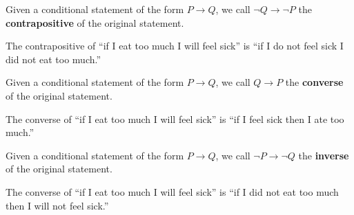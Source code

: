 \documentclass[]{article}
\begin{document}
\begin{defn}[Contrapositive] Given a conditional statement of the form $P \rightarrow Q$, we call $\neg Q \rightarrow \neg P$ the \textbf{contrapositive} of the original statement. 
\end{defn}
\begin{exmp} The contrapositive of ``if I eat too much I will feel sick'' is ``if I do not feel sick I did not eat too much.''
\end{exmp}
\begin{defn}[Converse] Given a conditional statement of the form $P \rightarrow Q$, we call $Q \rightarrow P$ the \textbf{converse} of the original statement. 
\begin{exmp} The converse of ``if I eat too much I will feel sick'' is ``if I feel sick then I ate too much.''
\end{exmp}
\end{defn}
\begin{defn}[Inverse] Given a conditional statement of the form $P \rightarrow Q$, we call $\neg P\rightarrow \neg Q$ the \textbf{inverse} of the original statement.
\end{defn}	
\begin{exmp} The converse of ``if I eat too much I will feel sick'' is ``if I did not eat too much then I will not feel sick.''
\end{exmp}
\end{document}
